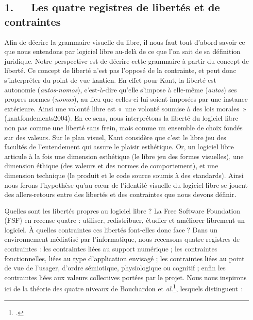 \documentclass{FramateX}
\begin{document}
\begin{refsection}
\section*{1.~~~Les quatre registres de libertés et de contraintes}
{}


Afin de décrire la grammaire visuelle du libre, il nous faut tout
d'abord savoir ce que nous entendons par logiciel libre au-delà de ce
que l'on sait de sa définition juridique. Notre perspective est de
décrire cette grammaire à partir du concept de liberté. Ce concept de
liberté n'est pas l'opposé de la contrainte, et peut donc s'interpréter
du point de vue kantien. En effet pour Kant, la liberté est autonomie
(\textit{autos-nomos}), c'est-à-dire qu'elle s'impose à elle-même
(\textit{autos}) ses propres normes (\textit{nomos}), au lieu que celles-ci
lui soient imposées par une instance extérieure. Ainsi une volonté
libre est «~une volonté soumise à des lois morales~» ({kantfondements2004}).
En ce sens, nous interprétons la liberté du logiciel libre non pas
comme une liberté sans frein, mais comme un ensemble de choix fondés
sur des valeurs. Sur le plan visuel, Kant considère que c'est le libre
jeu des facultés de l'entendement qui assure le plaisir esthétique. Or,
un logiciel libre articule à la fois une dimension esthétique (le libre
jeu des formes visuelles), une dimension éthique (des valeurs et des
normes de comportement), et une dimension technique (le produit et le
code source soumis à des standards). Ainsi nous ferons l'hypothèse
qu'au cœur de l'identité visuelle du logiciel libre se jouent des
allers{}-retours entre des libertés et des contraintes que nous devons
définir. 

Quelles sont les libertés propres au logiciel libre ? La Free
Software Foundation (FSF) en recense quatre : utiliser, redistribuer,
étudier et améliorer librement un logiciel. À quelles contraintes ces
libertés font-elles donc face ? Dans un environnement médiatisé par
l'informatique, nous recensons quatre registres de contraintes : les
contraintes liées au support numérique ; les contraintes
fonctionnelles, liées au type d'application envisagé ; les contraintes
liées au point de vue de l'usager, d'ordre sémiotique, physiologique ou
cognitif ; enfin les contraintes liées aux valeurs collectives portées
par le projet. Nous nous inspirons ici de la théorie des quatre niveaux
de Bouchardon et \textit{al.}\footnote{\cite{bouchardonexplorer2011}.}, lesquels distinguent : 


\end{refsection}
\end{document}
